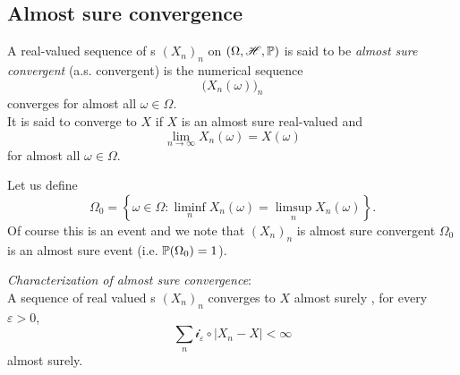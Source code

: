 \documentclass{report}
\begin{document}
\subsection{Almost sure convergence}
\begin{definition}
	A real-valued sequence of \rv s ${(X_n)}_{n}$ on $(\Omega,\mathscr{H},\mathbb{P})$ is said to be \emph{almost sure convergent} (a.s. convergent) is the numerical sequence
	\[{\Big(X_n(\omega)\Big)}_{n}\]
	converges for almost all $\omega\in\Omega$. \\
	It is said to converge to $X$ if $X$ is an almost sure real-valued \rv{} and 
	\[\lim_{n\to\infty}X_n(\omega)=X(\omega)\]
	for almost all $\omega\in\Omega$.
\end{definition}
Let us define
\[\Omega_0=\left\{\omega\in\Omega:\liminf_n X_n(\omega)=\limsup_n X_n(\omega)\right\}.\]
Of course this is an event and we note that ${(X_n)}_{n}$ is almost sure convergent \ifonly{} $\Omega_0$ is an almost sure event (i.e. $\mathbb{P}(\Omega_0)=1$).
\begin{theorem}
	\emph{Characterization of almost sure convergence}:\\
	A sequence of real valued \rv s ${(X_n)}_{n}$ converges to $X$ almost surely \ifonly{}, for every $\varepsilon>0$,
	\begin{equation}
		\sum_n\mathcal{i}_\varepsilon\circ|X_n-X|<\infty\tag{$\star\star$}\label{charconvsurealmost}
	\end{equation}
	almost surely.
\end{theorem}
\end{document}
